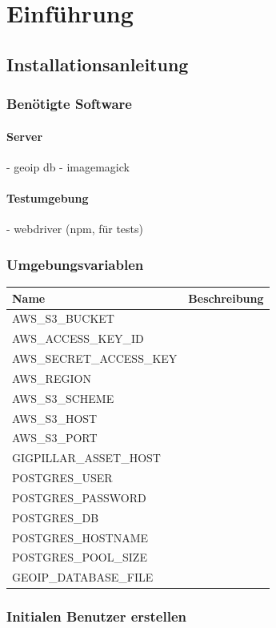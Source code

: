 \chapter{Einführung}\label{AppendixEinführung}

\section{Installationsanleitung}

\subsection{Benötigte Software}

\subsubsection{Server}
- geoip db
- imagemagick

\subsubsection{Testumgebung}
- webdriver (npm, für tests)

\subsection{Umgebungsvariablen}

\begin{longtable}[]{@{}ll@{}}
  \toprule
  \textbf{Name}            & \textbf{Beschreibung}\tabularnewline
  \midrule
  AWS\_S3\_BUCKET          & \tabularnewline
  AWS\_ACCESS\_KEY\_ID     & \tabularnewline
  AWS\_SECRET\_ACCESS\_KEY & \tabularnewline
  AWS\_REGION              & \tabularnewline
  AWS\_S3\_SCHEME          & \tabularnewline
  AWS\_S3\_HOST            & \tabularnewline
  AWS\_S3\_PORT            & \tabularnewline
  GIGPILLAR\_ASSET\_HOST   & \tabularnewline
  POSTGRES\_USER           & \tabularnewline
  POSTGRES\_PASSWORD       & \tabularnewline
  POSTGRES\_DB             & \tabularnewline
  POSTGRES\_HOSTNAME       & \tabularnewline
  POSTGRES\_POOL\_SIZE     & \tabularnewline
  GEOIP\_DATABASE\_FILE    & \tabularnewline
  \bottomrule
\end{longtable}

\clearpage
\subsection{Initialen Benutzer erstellen}

